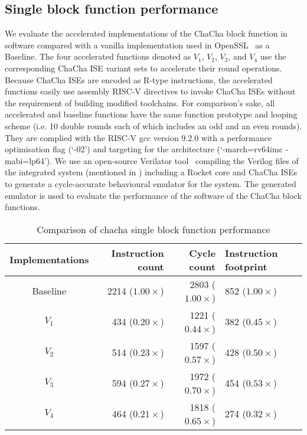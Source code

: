 
\subsection{Single block function performance}
\label{sec:eval:blk}
We evaluate the accelerated implementations of the ChaCha block function in software compared with a vanilla implementation used in OpenSSL~\cite{OpenSSL} as a Baseline. The four accelerated functions denoted as $V_1$, $V_2$, $V_3$, and $V_4$ use the corresponding ChaCha ISE variant sets to accelerate their round operations. 
Because ChaCha ISEs are encoded as R-type instructions, the accelerated functions easily use assembly RISC-V directives  to invoke ChaCha ISEs without the requirement of building modified toolchains.   
For comparison's sake, all accelerated and baseline functions have the same function prototype and looping scheme (i.e. 10 double rounds each of which includes an odd and an even rounds). 
They are complied with the RISC-V gcc version 9.2.0 with a performance optimisation flag (`-02') and targeting for the  architecture (`-march=rv64imc -mabi=lp64'). 
We use an open-source Verilator tool~\cite{Verilator} compiling the Verilog files of the integrated system (mentioned in ) including a Rocket core and ChaCha ISEs to generate a cycle-accurate behavioural emulator for the system. The generated emulator is used to evaluate the performance of the software of the ChaCha block functions.  

\begin{table}[b]
\caption{Comparison of chacha single block function performance}
\label{tab:res:sw:perf1}
\begin{tabular}{crrl}
\toprule            
Implementations        & Instruction count   & Cycle count & Instruction footprint\\

\midrule
Baseline     & 2214 ($1.00\times$)  & 2803 ($1.00\times$)    &  852 ($1.00\times$)  \\
 $V_1$ &  434 ($0.20\times$)     & 1221 ($0.44\times$) &  382 ($0.45\times$) \\
 $V_2$ &  514 ($0.23\times$)     & 1597 ($0.57\times$) &  428 ($0.50\times$)\\
 $V_3$ &  594 ($0.27\times$)     & 1972 ($0.70\times$) &  454 ($0.53\times$)\\
 $V_4$ &  464 ($0.21\times$)     & 1818 ($0.65\times$) &  274 ($0.32\times$)\\

\bottomrule
\end{tabular}
\end{table}

